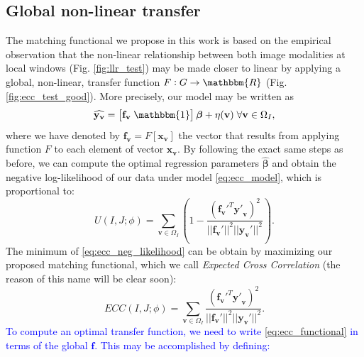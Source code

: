 \subsection{Global non-linear transfer}
The matching functional we propose in this work is based on the empirical observation that the non-linear relationship between both image modalities at local windows (Fig. \ref{fig:llr_test}) may be made closer to linear by applying a global, non-linear, transfer function $F: G \rightarrow \mathbbm{R}$ (Fig. \ref{fig:ecc_test_good}). More precisely, our model may be written as
\begin{equation}\label{eq:ecc_model}
\widehat{\mathbf{y}_{\mathbf{v}}} = \left[\mathbf{f_{v}} \; \mathbbm{1}\right]\boldsymbol{\beta} + \eta(\mathbf{v}) \; \forall \mathbf{v}\in\Omega_{I},
\end{equation}
where we have denoted by $\mathbf{f_{v}} = F[\mathbf{x}_{\mathbf{v}}]$ the vector that results from applying function $F$ to each element of vector $\mathbf{x}_{\mathbf{v}}$. By following the exact same steps as before, we can compute the optimal regression parameters $\widehat{\boldsymbol{\beta}}$ and obtain the negative log-likelihood of our data under model \eqref{eq:ecc_model}, which is proportional to:
\begin{equation}\label{eq:ecc_neg_likelihood}
    U(I, J;\phi) = \sum_{\mathbf{v} \in \Omega_{I}} \left( 1 - \frac{(\mathbf{f_{v}'}^{T} \mathbf{y'}_{\mathbf{v}})^{2}}{||\mathbf{f_{v}'}||^{2}||\mathbf{y_{v}'}||^{2}}\right).
\end{equation}
The minimum of \eqref{eq:ecc_neg_likelihood} can be obtain by maximizing our proposed matching functional, which we call \emph{Expected Cross Correlation} (the reason of this name will be clear soon):
\begin{equation}\label{eq:ecc_functional}
    ECC(I, J;\phi) = \sum_{\mathbf{v} \in \Omega_{I}} \frac{(\mathbf{f_{v}'}^{T} \mathbf{y'}_{\mathbf{v}})^{2}}{||\mathbf{f_{v}'}||^{2}||\mathbf{y_{v}'}||^{2}}.
\end{equation}
\textcolor{blue}{To compute an optimal transfer function, we need to write \eqref{eq:ecc_functional} in terms of the global $\mathbf{f}$. This may be accomplished by defining:}

